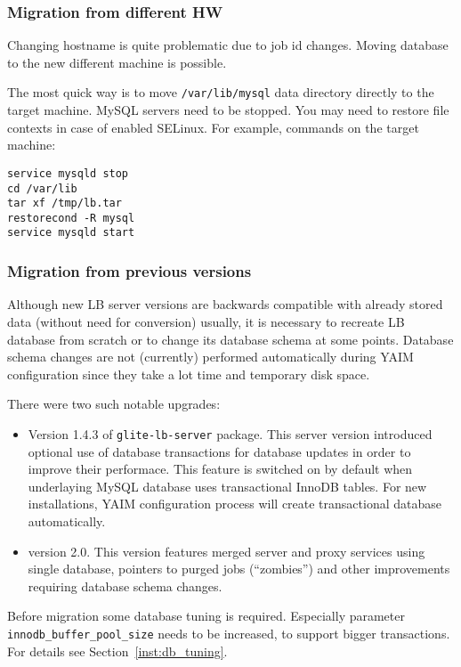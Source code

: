 \subsubsection{Migration from different HW}

Changing hostname is quite problematic due to job id changes. Moving database to the new different machine is possible.

The most quick way is to move \verb'/var/lib/mysql' data directory directly to the target machine. MySQL servers need to be stopped. You may need to restore file contexts in case of enabled SELinux. For example, commands on the target machine:

\begin{verbatim}
service mysqld stop
cd /var/lib
tar xf /tmp/lb.tar
restorecond -R mysql
service mysqld start
\end{verbatim}


\subsubsection{Migration from previous versions}

Although new LB server versions are backwards compatible with already 
stored data (without need for conversion) usually, it is necessary to recreate
LB database from scratch or to change its database schema at some points.
Database schema changes are not (currently) performed automatically 
during YAIM configuration since they take a lot time and temporary disk
space.  

There were two such notable upgrades:
\begin{itemize}
\item Version 1.4.3 of \texttt{glite-lb-server} package. This \LB server version introduced optional use of database transactions for \LB database updates in order to improve their performace. This feature is switched on by default when underlaying MySQL database uses transactional InnoDB tables. For new installations, YAIM configuration process will create transactional database automatically.

\item \LB version 2.0.  This version features merged \LB server and proxy services using single database, pointers to purged jobs (``zombies'') and other improvements requiring database schema changes.
\end{itemize}

\pagebreak Before migration some database tuning is required. Especially parameter \texttt{innodb\_buffer\_pool\_size} needs to be increased, to support bigger transactions. For details see Section~\ref{inst:db_tuning}.

